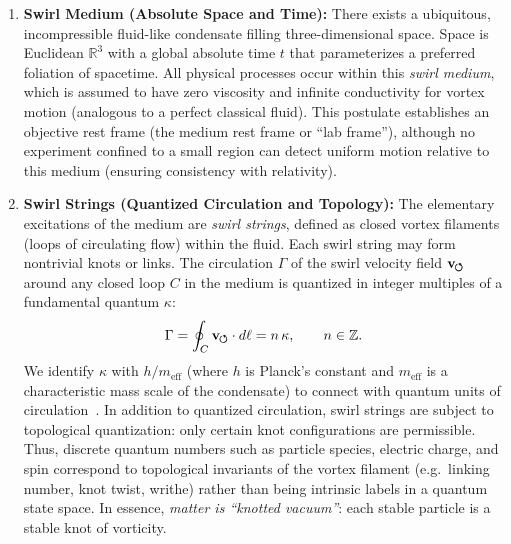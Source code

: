 \documentclass[10pt,reprint,aps,onecolumn,nofootinbib]{revtex4-2}
\newcommand{\swirlarrow}{%
    \mathchoice{\mkern-2mu\scriptstyle\boldsymbol{\circlearrowleft}}%
    {\mkern-2mu\scriptstyle\boldsymbol{\circlearrowleft}}%
    {\mkern-2mu\scriptstyle\boldsymbol{\circlearrowleft}}%
    {\mkern-2mu\scriptscriptstyle\boldsymbol{\circlearrowleft}}%
}
\newcommand{\vswirl}{\mathbf{v}_{\swirlarrow}}
\begin{document}
\begin{enumerate}
    \item \textbf{Swirl Medium (Absolute Space and Time):} There exists a ubiquitous, incompressible fluid-like condensate filling three-dimensional space. Space is Euclidean $\mathbb{R}^3$ with a global absolute time $t$ that parameterizes a preferred foliation of spacetime. All physical processes occur within this \emph{swirl medium}, which is assumed to have zero viscosity and infinite conductivity for vortex motion (analogous to a perfect classical fluid). This postulate establishes an objective rest frame (the medium rest frame or ``lab frame''), although no experiment confined to a small region can detect uniform motion relative to this medium (ensuring consistency with relativity).

\item \textbf{Swirl Strings (Quantized Circulation and Topology):} The elementary excitations of the medium are \emph{swirl strings}, defined as closed vortex filaments (loops of circulating flow) within the fluid. Each swirl string may form nontrivial knots or links. The circulation $\Gamma$ of the swirl velocity field $\vswirl$ around any closed loop $C$ in the medium is quantized in integer multiples of a fundamental quantum $\kappa$: 
\begin{equation}
        \Gamma = \oint_C \vswirl \cdot d\ell = n\,\kappa, \qquad n \in \mathbb{Z}.
\end{equation}
    We identify $\kappa$ with $h/m_{\mathrm{eff}}$ (where $h$ is Planck’s constant and $m_{\mathrm{eff}}$ is a characteristic mass scale of the condensate) to connect with quantum units of circulation~\cite{Onsager1949, Feynman1955}. In addition to quantized circulation, swirl strings are subject to topological quantization: only certain knot configurations are permissible. Thus, discrete quantum numbers such as particle species, electric charge, and spin correspond to topological invariants of the vortex filament (e.g.\ linking number, knot twist, writhe) rather than being intrinsic labels in a quantum state space. In essence, \emph{matter is ``knotted vacuum''}: each stable particle is a stable knot of vorticity.


\end{enumerate}
\end{document}
